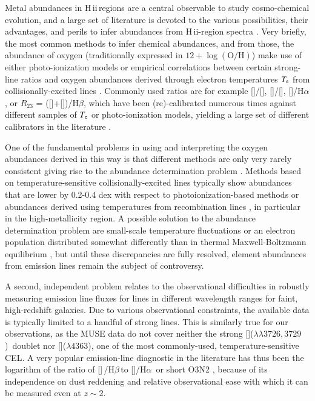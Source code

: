 \documentclass[traditabstract]{aa}
\newcommand{\hb}{H$\beta$}
\newcommand{\ha}{H$\alpha$}
\newcommand{\hii}{\mbox{H\,{\sc ii}}}
\newcommand{\oh}{$12+\log(\mathrm{O/H})$}
\newcommand{\oii}{[\ion{O}{ii}]}
\newcommand{\oiii}{[\ion{O}{iii}]}
\newcommand{\nii}{[\ion{N}{ii}]}
\begin{document}
Metal abundances in \hii\,regions are a central observable to study cosmo-chemical evolution, and a large set of literature is devoted to the various possibilities, their advantages, and perils to infer abundances from \hii-region spectra  \citep[e.g.][]{1979MNRAS.189...95P, 1991ApJ...380..140M, 2005ApJ...631..231P, 2008ApJ...681.1183K}. Very briefly, the most common methods to infer chemical abundances, and from those, the abundance of oxygen (traditionally expressed in \oh) make use of either photo-ionization models \citep[e.g.][]{1985ApJS...58..125E, 2000ApJ...542..224D, 2002ApJS..142...35K} or empirical correlations between certain strong-line ratios and oxygen abundances derived through electron temperatures $T_{\rm{e}}$ from collisionally-excited lines \citep[CELs, e.g.][]{2004MNRAS.348L..59P, 2013A&A...559A.114M}. Commonly used ratios are for example \nii/\oii, \oiii/\nii, \nii/\ha, or $R_{23}$ = (\oii+\oiii)/\hb, which have been (re)-calibrated numerous times against different samples of $T_{\rm{e}}$ or photo-ionization models, yielding a large set of different calibrators in the literature \citep[e.g.][]{2002ApJS..142...35K, 2004ApJ...617..240K, 2005ApJ...631..231P, 2006A&A...459...85N, 2008A&A...488..463M}.

One of the fundamental problems in using and interpreting the oxygen abundances derived in this way is that different methods are only very rarely consistent \citep[e.g.][]{2008ApJ...681.1183K} giving rise to the abundance determination problem \citep{1967ApJ...150..825P}. Methods based on temperature-sensitive collisionally-excited lines typically show abundances that are lower by 0.2-0.4 dex with respect to photoionization-based methods or abundances derived using temperatures from recombination lines \citep[e.g.][and references therein]{2012MNRAS.426.2630L}, in particular in the high-metallicity region. A possible solution to the abundance determination problem are small-scale temperature fluctuations \citep[e.g.][]{2003ApJ...584..735P, 2004MNRAS.355..229E} or an electron population distributed somewhat differently than in thermal Maxwell-Boltzmann equilibrium \citep{2012ApJ...752..148N, 2012MNRAS.426.2630L}, but until these discrepancies are fully resolved, element abundances from emission lines remain the subject of controversy.

A second, independent problem relates to the observational difficulties in robustly measuring emission line fluxes for lines in different wavelength ranges for faint, high-redshift galaxies. Due to various observational constraints, the available data is typically limited to a handful of strong lines. This is similarly true for our observations, as the MUSE data do not cover neither the strong \oii($\lambda\lambda3726,3729$)~doublet nor \oiii($\lambda 4363$), one of the most commonly-used, temperature-sensitive CEL. A very popular emission-line diagnostic in the literature has thus been the logarithm of the ratio of \oiii\,/\hb\,to \nii/\ha\, or short O3N2 \citep[e.g.][]{2004MNRAS.348L..59P, 2013A&A...559A.114M}, because of its independence on dust reddening and relative observational ease with which it can be measured even at $z\sim 2$.
\end{document}
